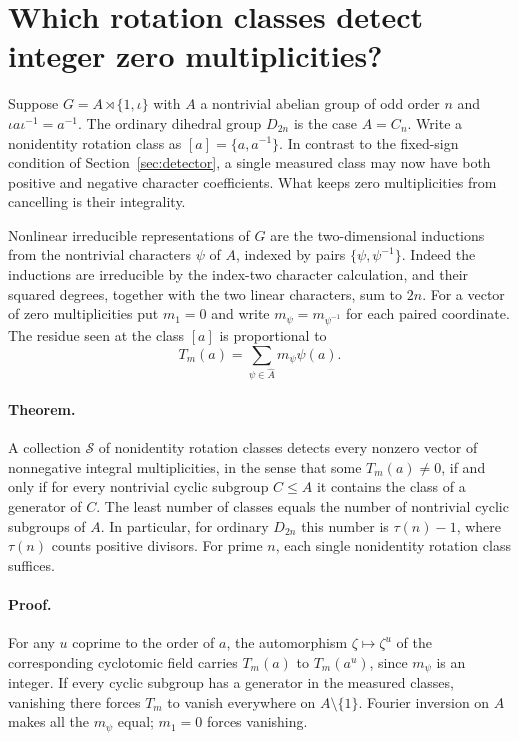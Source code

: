 \section{Which rotation classes detect integer zero multiplicities?}
\label{sec:rotation}
Suppose $G=A\rtimes\{1,\iota\}$ with $A$ a nontrivial abelian group of odd order $n$ and $\iota a\iota^{-1}=a^{-1}$. The ordinary dihedral group $D_{2n}$ is the case $A=C_n$. Write a nonidentity rotation class as $[a]=\{a,a^{-1}\}$. In contrast to the fixed-sign condition of Section~\ref{sec:detector}, a single measured class may now have both positive and negative character coefficients. What keeps zero multiplicities from cancelling is their integrality.

Nonlinear irreducible representations of $G$ are the two-dimensional inductions from the nontrivial characters $\psi$ of $A$, indexed by pairs $\{\psi,\psi^{-1}\}$. Indeed the inductions are irreducible by the index-two character calculation, and their squared degrees, together with the two linear characters, sum to $2n$. For a vector of zero multiplicities put $m_1=0$ and write $m_{\psi}=m_{\psi^{-1}}$ for each paired coordinate. The residue seen at the class $[a]$ is proportional to
\[
              T_m(a)=\sum_{\psi\in\widehat A}m_{\psi}\psi(a).
\]

\paragraph{Theorem.}
A collection $\mathcal S$ of nonidentity rotation classes detects every nonzero vector of nonnegative integral multiplicities, in the sense that some $T_m(a)\ne0$, if and only if for every nontrivial cyclic subgroup $C\le A$ it contains the class of a generator of $C$. The least number of classes equals the number of nontrivial cyclic subgroups of $A$. In particular, for ordinary $D_{2n}$ this number is $\tau(n)-1$, where $\tau(n)$ counts positive divisors. For prime $n$, each single nonidentity rotation class suffices.

\paragraph{Proof.}
For any $u$ coprime to the order of $a$, the automorphism $\zeta\mapsto\zeta^u$ of the corresponding cyclotomic field carries $T_m(a)$ to $T_m(a^u)$, since $m_\psi$ is an integer. If every cyclic subgroup has a generator in the measured classes, vanishing there forces $T_m$ to vanish everywhere on $A\setminus\{1\}$. Fourier inversion on $A$ makes all the $m_\psi$ equal; $m_1=0$ forces vanishing.


